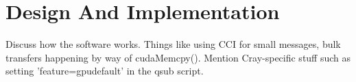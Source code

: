 \section{Design And Implementation}
\label{sec:design}

Discuss how the software works.  Things like using CCI for small messages, bulk transfers happening by way of cudaMemcpy().  Mention Cray-specific stuff such as setting 'feature=gpudefault' in the qsub script. 


